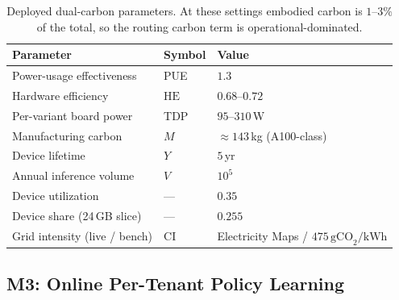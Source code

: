 \documentclass[10pt,twocolumn]{article}
\newcommand{\gcokwh}{\,\text{gCO}_2/\text{kWh}}
\begin{document}
\begin{table}[t]
  \centering \small
  \begin{tabular}{@{}lll@{}}
    \toprule
    \textbf{Parameter} & \textbf{Symbol} & \textbf{Value} \\
    \midrule
    Power-usage effectiveness & PUE & $1.3$ \\
    Hardware efficiency & $\text{HE}$ & $0.68$--$0.72$ \\
    Per-variant board power & TDP & $95$--$310$\,W \\
    Manufacturing carbon & $M$ & $\approx 143$\,kg (A100-class) \\
    Device lifetime & $Y$ & $5$\,yr \\
    Annual inference volume & $V$ & $10^{5}$ \\
    Device utilization & --- & $0.35$ \\
    Device share (24\,GB slice) & --- & $0.255$ \\
    Grid intensity (live / bench) & CI & Electricity Maps / $475\gcokwh$ \\
    \bottomrule
  \end{tabular}
  \caption{Deployed dual-carbon parameters. At these settings embodied carbon
  is $1$--$3\%$ of the total, so the routing carbon term is
  operational-dominated.}
  \label{tab:params}
\end{table}

\subsection{M3: Online Per-Tenant Policy Learning}
\label{sec:m3}
\end{document}
